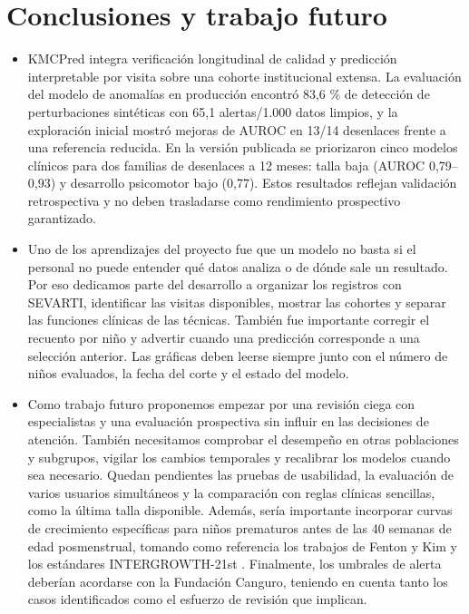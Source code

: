 \section{Conclusiones y trabajo futuro}
\label{sec:conclusiones}

\begin{itemize}
\item KMCPred integra verificación longitudinal de calidad y predicción interpretable por visita sobre una cohorte institucional extensa. La evaluación del modelo de anomalías en producción encontró 83,6 \% de detección de perturbaciones sintéticas con 65,1 alertas/1.000 datos limpios, y la exploración inicial mostró mejoras de AUROC en 13/14 desenlaces frente a una referencia reducida. En la versión publicada se priorizaron cinco modelos clínicos para dos familias de desenlaces a 12 meses: talla baja (AUROC 0,79--0,93) y desarrollo psicomotor bajo (0,77). Estos resultados reflejan validación retrospectiva y no deben trasladarse como rendimiento prospectivo garantizado.
\item Uno de los aprendizajes del proyecto fue que un modelo no basta si el personal no puede entender qué datos analiza o de dónde sale un resultado. Por eso dedicamos parte del desarrollo a organizar los registros con SEVARTI, identificar las visitas disponibles, mostrar las cohortes y separar las funciones clínicas de las técnicas. También fue importante corregir el recuento por niño y advertir cuando una predicción corresponde a una selección anterior. Las gráficas deben leerse siempre junto con el número de niños evaluados, la fecha del corte y el estado del modelo.
\item Como trabajo futuro proponemos empezar por una revisión ciega con especialistas y una evaluación prospectiva sin influir en las decisiones de atención. También necesitamos comprobar el desempeño en otras poblaciones y subgrupos, vigilar los cambios temporales y recalibrar los modelos cuando sea necesario. Quedan pendientes las pruebas de usabilidad, la evaluación de varios usuarios simultáneos y la comparación con reglas clínicas sencillas, como la última talla disponible. Además, sería importante incorporar curvas de crecimiento específicas para niños prematuros antes de las 40 semanas de edad posmenstrual, tomando como referencia los trabajos de Fenton y Kim \cite{r33} y los estándares INTERGROWTH-21st \cite{r34}. Finalmente, los umbrales de alerta deberían acordarse con la Fundación Canguro, teniendo en cuenta tanto los casos identificados como el esfuerzo de revisión que implican.
\end{itemize}
